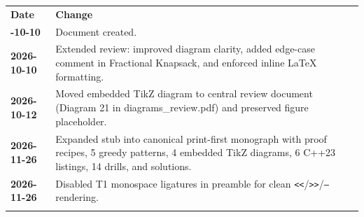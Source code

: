 \documentclass[11pt,a4paper]{article}
\theoremstyle{definition}
\begin{document}
\begin{center}
\begingroup
\small
{}
\begin{tabularx}{\textwidth}{>{\bfseries}l >{\raggedright\arraybackslash}X}
\arrayrulecolor{primaryblue}\toprule[1.2pt]
\rowcolor{primaryblue!10}
\textcolor{primaryblue}{\textbf{Date}} & \textcolor{primaryblue}{\textbf{Change}} \\
\arrayrulecolor{codeframe}\midrule[0.6pt]
2026-10-10 & Document created. \\
2026-10-10 & Extended review: improved diagram clarity, added edge-case comment in Fractional Knapsack, and enforced inline LaTeX formatting. \\
2026-10-12 & Moved embedded TikZ diagram to central review document (Diagram 21 in diagrams\_review.pdf) and preserved figure placeholder. \\
2026-11-26 & Expanded stub into canonical print-first monograph with proof recipes, 5 greedy patterns, 4 embedded TikZ diagrams, 6 C++23 listings, 14 drills, and solutions. \\
2026-11-26 & Disabled T1 monospace ligatures in preamble for clean \texttt{<<}/\texttt{>>}/\texttt{--} rendering. \\
\arrayrulecolor{primaryblue}\bottomrule[1.2pt]
\end{tabularx}
\endgroup
\end{center}
\end{document}
